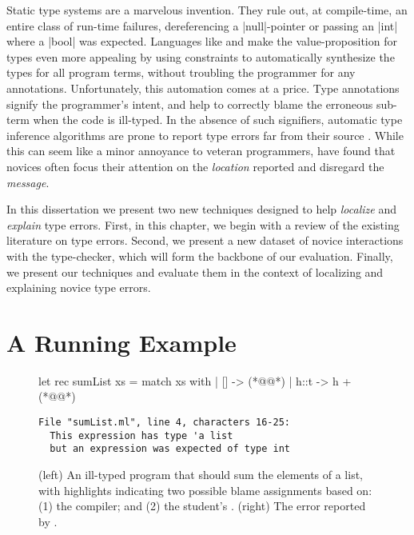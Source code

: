 Static type systems are a marvelous invention.
%
They rule out, at compile-time, an entire class of run-time failures,
\eg dereferencing a |null|-pointer or passing an |int| where a |bool|
was expected.
%
Languages like \ocaml and \haskell make
the value-proposition for types even more
appealing by using constraints to automatically
synthesize the types for all program terms,
without troubling the programmer for any
annotations.
%
Unfortunately, this automation comes at a price.
%
Type annotations signify the programmer's intent, and help to correctly
blame the erroneous sub-term when the code is ill-typed.
%
In the absence of such signifiers, automatic type inference algorithms
are prone to report type errors far from their source
\citep{Wand1986-nw}.
%
While this can seem like a minor annoyance to veteran programmers,
\citet{Joosten1993-yx} have found that novices often focus their
attention on the \emph{location} reported and disregard the
\emph{message}.

In this dissertation we present two new techniques designed to help
\emph{localize} and \emph{explain} type errors.
%
First, in this chapter, we begin with a review of the existing
literature on type errors.
%
Second, we present a new dataset of novice interactions with the \ocaml
type-checker, which will form the backbone of our evaluation.
%
Finally, we present our techniques and evaluate them in the context of
localizing and explaining novice type errors.

\section{A Running Example}
\label{sec:intro:sumList}

\begin{figure}[t]
\small
\begin{minipage}{0.45\linewidth}
\begin{ecode}
let rec sumList xs =
  match xs with
  | []   -> (*@\hlSherrloc{[]}@*)
  | h::t -> h + (*@@*)
\end{ecode}
\end{minipage}
\begin{minipage}{0.49\linewidth}
\begin{verbatim}
File "sumList.ml", line 4, characters 16-25:
  This expression has type 'a list
  but an expression was expected of type int

\end{verbatim}
\end{minipage}
\caption{(left) An ill-typed \ocaml program that should sum the elements of a
  list, with highlights indicating two possible blame assignments based on:
  (1) the \hlTree{\ocaml} compiler; and
  (2) the student's .
  (right) The error reported by \ocaml.}
\label{fig:intro:sumList}
\end{figure}

